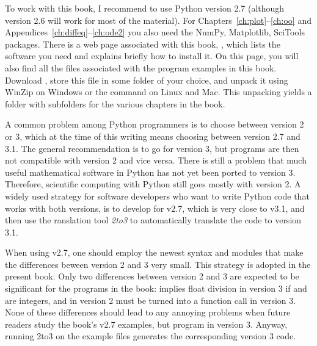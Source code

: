 To work with this book, I recommend to use Python version 2.7 (although
version 2.6 will work for most of the material).
For Chapters~\ref{ch:plot}--\ref{ch:oo} and Appendices~\ref{ch:diffeq}--\ref{ch:ode2}
you also need the NumPy, Matplotlib, SciTools packages.
There is a web page
associated with this book,
,
which lists the software you need and explains briefly how to install it.
On this page, you will also find all
the files associated with the program examples
in this book. Download
, store this file
in some folder of your choice, and unpack it
using WinZip on
Windows or the command
on Linux and Mac.
This unpacking yields a folder  with subfolders for the
various chapters in the book.

A common problem among Python programmers is to choose between version
2 or 3, which at the time of this writing means choosing
between version 2.7 and 3.1.
The general recommendation is to go for version 3, but programs are
then not compatible with version 2 and vice versa. There is still
a problem that much useful mathematical software in Python
has not yet been ported to version 3. Therefore, scientific computing
with Python still goes mostly with version 2.
A widely used strategy for software
developers who want to write Python code that works with both versions,
is to develop for v2.7, which is very close to v3.1, and then
use the ranslation tool \emph{2to3} to automatically translate the code
to version 3.1.

When using v2.7, one should employ the newest syntax
and modules that make the differences beween version 2 and 3 very small.
This strategy is adopted in the present book. Only two
differences between version 2 and 3 are expected to be significant for
the programs in the book:
 implies float division in version 3 if  and 
are integers,
and  in version 2 must be turned into a function call
 in version 3. None of these differences should lead
to any annoying problems when future readers study the book's v2.7
examples, but program in version 3. Anyway, running 2to3 on the
example files generates the corresponding version 3 code.



